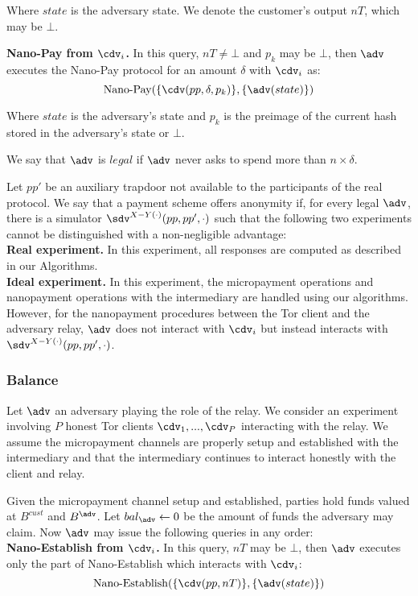 Where $state$ is the adversary state.
We denote the customer's output $nT$, which may be $\bot$.

\textbf{Nano-Pay from $\cdv_i$.}
In this query, $nT \neq \bot$ and $p_k$ may be $\bot$, then $\adv$ executes the Nano-Pay protocol for an amount $\delta$ with $\cdv_i$ as: $$\operatorname{Nano-Pay}(\{\cdv(pp, \delta, p_k)\}, \{\adv(state)\})$$

Where $state$ is the adversary's state and $p_k$ is the preimage of the current hash stored in the adversary's state or $\bot$.

We say that $\adv$ is $legal$ if $\adv$ never asks to spend more than $n \times \delta$.

Let $pp'$ be an auxiliary trapdoor not available to the participants of the real protocol.
We say that a payment scheme offers anonymity if, for every legal $\adv$, there is a simulator $\sdv^{X-Y(\cdot)}(pp, pp', \cdot)$ such that the following two experiments cannot be distinguished with a non-negligible advantage:\\ \textbf{Real experiment.}
In this experiment, all responses are computed as described in our Algorithms.\\ \textbf{Ideal experiment.}
In this experiment, the micropayment operations and nanopayment operations with the intermediary are handled using our algorithms.
However, for the nanopayment procedures between the Tor client and the adversary relay, $\adv$ does not interact with $\cdv_i$ but instead interacts with $\sdv^{X-Y(\cdot)}(pp,pp',\cdot)$.

\subsubsection{Balance}
\label{def:balance}

Let $\adv$ an adversary playing the role of the relay.
We consider an experiment involving $P$ honest Tor clients $\cdv_1,..., \cdv_P$ interacting with the relay.
We assume the micropayment channels are properly setup and established with the intermediary and that the intermediary continues to interact honestly with the client and relay.

Given the micropayment channel setup and established, parties hold funds valued at $B^{cust}$ and $B^{\adv}$.
Let $bal_\adv \leftarrow 0$ be the amount of funds the adversary may claim.
Now $\adv$ may issue the following queries in any order:\\

\textbf{Nano-Establish from $\cdv_i$.}
In this query, $nT$ may be $\bot$, then $\adv$ executes only the part of Nano-Establish which interacts with $\cdv_i$: $$\operatorname{Nano-Establish}(\{\cdv(pp, nT)\}, \{\adv(state)\})$$

